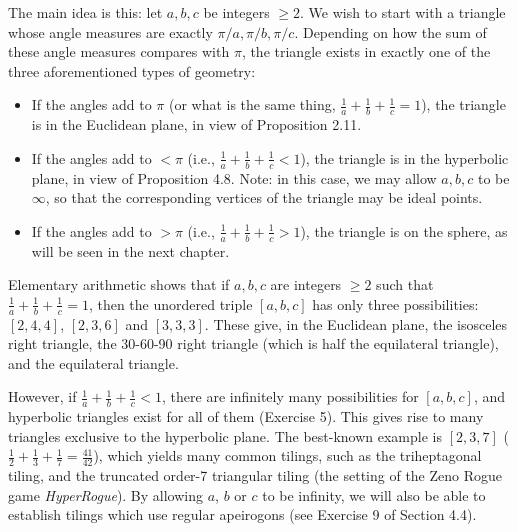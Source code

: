 \documentclass[leqno]{book}
\begin{document}
The main idea is this: let $a,b,c$ be integers $\geqslant 2$.  We wish to start with a triangle whose angle measures are exactly $\pi/a,\pi/b,\pi/c$.  Depending on how the sum of these angle measures compares with $\pi$, the triangle exists in exactly one of the three aforementioned types of geometry:
\begin{itemize}
\item If the angles add to $\pi$ (or what is the same thing, $\frac 1a+\frac 1b+\frac 1c=1$), the triangle is in the Euclidean plane, in view of Proposition 2.11.

\item If the angles add to $<\pi$ (i.e., $\frac 1a+\frac 1b+\frac 1c<1$), the triangle is in the hyperbolic plane, in view of Proposition 4.8.  Note: in this case, we may allow $a,b,c$ to be $\infty$, so that the corresponding vertices of the triangle may be ideal points.

\item If the angles add to $>\pi$ (i.e., $\frac 1a+\frac 1b+\frac 1c>1$), the triangle is on the sphere, as will be seen in the next chapter.
\end{itemize}
Elementary arithmetic shows that if $a,b,c$ are integers $\geqslant 2$ such that $\frac 1a+\frac 1b+\frac 1c=1$, then the unordered triple $[a,b,c]$ has only three possibilities: $[2,4,4]$, $[2,3,6]$ and $[3,3,3]$.  These give, in the Euclidean plane, the isosceles right triangle, the 30-60-90 right triangle (which is half the equilateral triangle), and the equilateral triangle.

However, if $\frac 1a+\frac 1b+\frac 1c<1$, there are infinitely many possibilities for $[a,b,c]$, and hyperbolic triangles exist for all of them (Exercise 5).  This gives rise to many triangles exclusive to the hyperbolic plane.  The best-known example is $[2,3,7]$ ($\frac 12+\frac 13+\frac 17=\frac{41}{42}$), which yields many common tilings, such as the triheptagonal tiling, and the truncated order-7 triangular tiling (the setting of the Zeno Rogue game \emph{HyperRogue}).  By allowing $a$, $b$ or $c$ to be infinity, we will also be able to establish tilings which use regular apeirogons (see Exercise 9 of Section 4.4).
\end{document}
